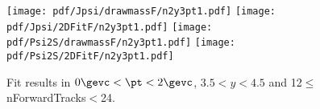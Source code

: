\begin{figure}[H]
\begin{center}
\texttt{[image: pdf/Jpsi/drawmassF/n2y3pt1.pdf]}
\texttt{[image: pdf/Jpsi/2DFitF/n2y3pt1.pdf]}
\vspace*{-0.5cm}
\texttt{[image: pdf/Psi2S/drawmassF/n2y3pt1.pdf]}
\texttt{[image: pdf/Psi2S/2DFitF/n2y3pt1.pdf]}
\vspace*{-0.5cm}
\end{center}
\caption{Fit results in $0\gevc<\pt<2\gevc$, $3.5<y<4.5$ and 12$\leq$nForwardTracks$<$24.}
\label{Fitn2y3pt1}
\end{figure}

